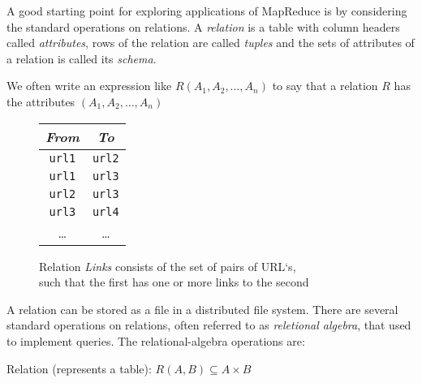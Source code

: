 A good starting point for exploring applications of MapReduce is by considering the standard operations on relations. A \textit{relation} is a table with column headers called \textit{attributes}, rows of the relation are called \textit{tuples} and the sets of attributes of a relation is called its \textit{schema}.

We often write an expression like $R(A_1, A_2, \dots, A_n)$ to say that a relation $R$ has the attributes $(A_1, A_2, \dots, A_n)$

\begin{figure}[H]
\centering
\begin{tabular}{|c|c|}
  \hline
  \textit{From} & \textit{To} \\
  \hline
  \texttt{url1} & \texttt{url2} \\
  \texttt{url1} & \texttt{url3} \\
  \texttt{url2} & \texttt{url3} \\
  \texttt{url3} & \texttt{url4} \\
  \dots         & \dots         \\
  \hline
\end{tabular}
\captionsetup{justification=centering}
\caption{Relation \textit{Links} consists of the set of pairs of URL`s, \\ such that the first has one or more links to the second}
\label{fig:relation-links}
\end{figure}

A relation can be stored as a file in a distributed file system. There are several standard operations on relations, often referred to as \textit{reletional algebra}, that used to implement queries. The relational-algebra operations are:

Relation (represents a table): $R(A,B) \subseteq A \times B$

